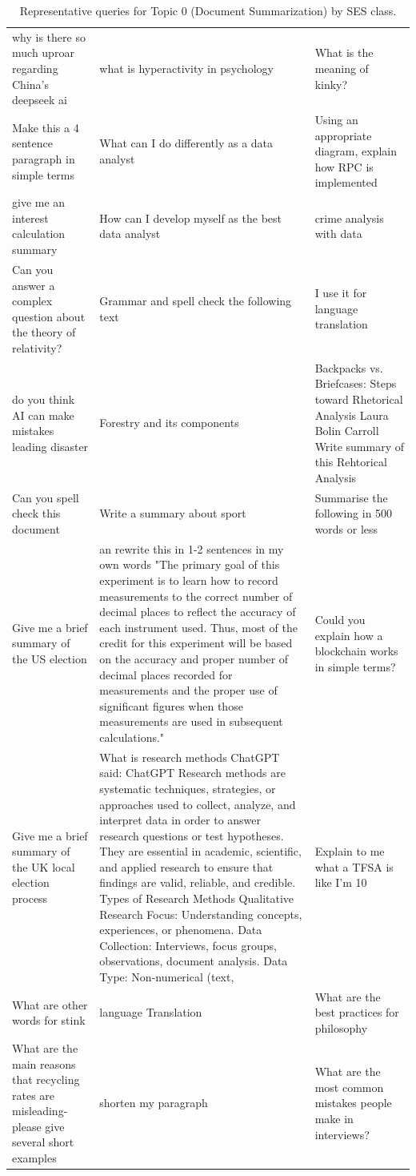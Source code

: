 \begin{table}[ht]
\begin{tabular}{p{4.3cm}p{4.3cm}p{4.3cm}}
why is there so much uproar regarding China's deepseek ai & what is hyperactivity in psychology & What is the meaning of kinky? \\[4pt]
Make this a 4 sentence paragraph in simple terms & What can I do differently as a data analyst & Using an appropriate diagram, explain how RPC is implemented \\[4pt]
give me an interest calculation summary & How can I develop myself as the best data analyst & crime analysis with data \\[4pt]
Can you answer a complex question about  the theory of relativity? & Grammar and spell check the following text & I use it for language translation \\[4pt]
do you think AI can make mistakes leading  disaster & Forestry and its components & Backpacks vs. Briefcases: Steps toward Rhetorical Analysis Laura Bolin Carroll                                                                                                                                                                                         Write summary of this Rehtorical Analysis \\[4pt]
Can you spell check this document & Write a summary about sport & Summarise the following in 500 words or less \\[4pt]
Give me a brief summary of the US election & an rewrite this in 1-2 sentences in my own words "The primary goal of this experiment is to learn how to record measurements to the correct number of decimal places to reflect the accuracy of each instrument used. Thus, most of the credit for this experiment will be based on the accuracy and proper number of decimal places recorded for measurements and the proper use of significant figures when those measurements are used in subsequent calculations." & Could you explain how a blockchain works in simple terms? \\[4pt]
Give me a brief summary of the UK local election process & What is research methods  ChatGPT said: ChatGPT Research methods are systematic techniques, strategies, or approaches used to collect, analyze, and interpret data in order to answer research questions or test hypotheses. They are essential in academic, scientific, and applied research to ensure that findings are valid, reliable, and credible.  Types of Research Methods Qualitative Research Focus: Understanding concepts, experiences, or phenomena. Data Collection: Interviews, focus groups, observations, document analysis. Data Type: Non-numerical (text, & Explain to me what a TFSA is like I'm 10 \\[4pt]
What are other words for stink & language Translation & What are the best practices for philosophy \\[4pt]
What are the main reasons that recycling rates are misleading- please give several short examples & shorten my paragraph & What are the most common mistakes people make in interviews? \\[4pt]
\bottomrule
\end{tabular}
\caption{Representative queries for Topic 0 (Document Summarization) by SES class.}
\label{tab:repr_queries_topic0}
\end{table}
